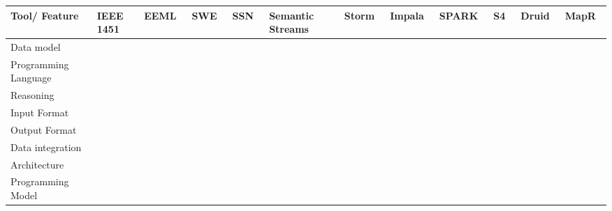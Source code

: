 \begin{sidewaystable}[!ht]
\renewcommand{\arraystretch}{1.3}
\tiny
\begin{center}
\begin{tabular}[c]{|p{1.7cm}|p{1.5cm}|p{1.5cm}|p{1.5cm}|p{1.5cm}|p{1.5cm}|p{1.5cm}|p{1.5cm}|p{1.5cm}|p{1.5cm}|p{1.5cm}|p{1.5cm}|} 
\hline
 \textbf{Tool/ Feature} & IEEE 1451 &  EEML~\cite{eeml} & SWE~\cite{sensorweb-wb} & SSN~\cite{Compton:2012:OPS:2400766.2401456} & Semantic Streams~\cite{Whitehouse:2006:SSF:2180141.2180148} & Storm~\cite{BigDataManing} & Impala~\cite{impala-project} & SPARK~\cite{zaharia2012discretized} & S4~\cite{neumeyer2010s4} & Druid~\cite{yangdruid} & MapR~\cite{mapr-project}\\ \hline
   Data model &  & &  &  &  &  &  &  &  &  & \\ \hline  
  Programming Language &  &   &  & & &  &  &  &  &  & \\ \hline  
  Reasoning &  & &  &  &  &  &  &  &  &  & \\ \hline  
  Input Format &  &  & &  &  &  &  &  &  &  & \\ \hline  
  Output Format &  & &  &  &  &  &  &  &  &  & \\ \hline  
  Data integration & & &   &  &  &  &  &  &  &  & \\ \hline  
  Architecture &  &  & &  &  &  &  &  &  &  & \\ \hline  
  Programming Model & & &   &  &  &  &  &  &  &  & \\ \hline  

\end{tabular}
\end{center}
\end{sidewaystable}
